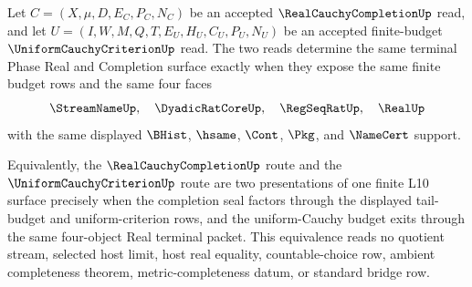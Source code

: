 \begin{theorem}
\label{thm:real-cauchy-completion-uniform-cauchy-terminal-equivalence}
Let $C=(X,\mu,D,E_C,P_C,N_C)$ be an accepted
$\RealCauchyCompletionUp$ read, and let
$U=(I,W,M,Q,T,E_U,H_U,C_U,P_U,N_U)$ be an accepted finite-budget
$\UniformCauchyCriterionUp$ read. The two reads determine the same terminal
Phase Real and Completion surface exactly when they expose the same finite
budget rows and the same four faces
$$
\StreamNameUp,\quad \DyadicRatCoreUp,\quad \RegSeqRatUp,\quad \RealUp
$$
with the same displayed $\BHist$, $\hsame$, $\Cont$, $\Pkg$, and $\NameCert$
support.

Equivalently, the $\RealCauchyCompletionUp$ route and the
$\UniformCauchyCriterionUp$ route are two presentations of one finite L10
surface precisely when the completion seal factors through the displayed
tail-budget and uniform-criterion rows, and the uniform-Cauchy budget exits
through the same four-object Real terminal packet. This equivalence reads no
quotient stream, selected host limit, host real equality, countable-choice row,
ambient completeness theorem, metric-completeness datum, or standard bridge row.
\end{theorem}
